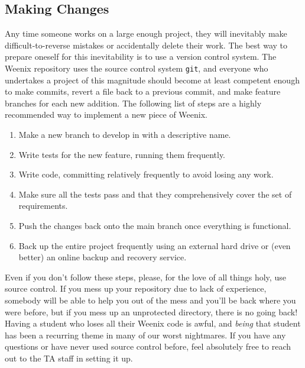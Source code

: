 \subsection{Making Changes}
Any time someone works on a large enough project, they will inevitably make difficult-to-reverse mistakes or accidentally delete their work. The best way to prepare oneself for this inevitability is to use a version control system. The Weenix repository uses the source control system \texttt{git}, and everyone who undertakes a project of this magnitude should become at least competent enough to make commits, revert a file back to a previous commit, and make feature branches for each new addition. The following list of steps are a highly recommended way to implement a new piece of Weenix.
\begin{enumerate}
    \item Make a new branch to develop in with a descriptive name.
    \item Write tests for the new feature, running them frequently.
    \item Write code, committing relatively frequently to avoid losing any work.
    \item Make sure all the tests pass and that they comprehensively cover the set of requirements.
    \item Push the changes back onto the main branch once everything is functional.
    \item Back up the entire project frequently using an external hard drive or (even better) an online backup and recovery service.
\end{enumerate}

Even if you don't follow these steps, please, for the love of all things holy, use source control. If you mess up your repository due to lack of experience, somebody will be able to help you out of the mess and you'll be back where you were before, but if you mess up an unprotected directory, there is no going back! Having a student who loses all their Weenix code is awful, and \emph{being} that student has been a recurring theme in many of our worst nightmares. If you have any questions or have never used source control before, feel absolutely free to reach out to the TA staff in setting it up.
 

